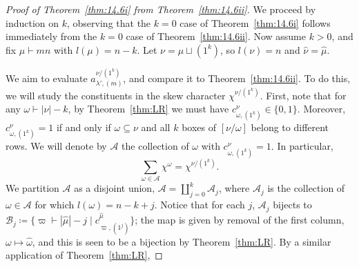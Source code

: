 \begin{proof}[Proof of Theorem~\ref{thm:14.6i} from Theorem~\ref{thm:14.6ii}]
	We proceed by induction on $k$, observing that the $k=0$ case of Theorem~\ref{thm:14.6i} follows immediately from the $k=0$ case of Theorem~\ref{thm:14.6ii}. 
	Now assume $k>0$, and fix $\mu\vdash mn$ with $l(\mu)=n-k$. Let $\nu=\mu\sqcup(1^k)$, so $l(\nu)=n$ and $\hat{\nu}=\hat{\mu}$.
	
	We aim to evaluate $a^{\nu/(1^k)}_{\lambda',(m)}$, and compare it to Theorem~\ref{thm:14.6ii}. To do this, we will study the constituents in the skew character $\chi^{\nu/(1^k)}$. First, note that for any $\omega\vdash|\nu|-k$, by Theorem~\ref{thm:LR} we must have $c^\nu_{\omega,(1^k)}\in\{0,1\}$. Moreover, $c^\nu_{\omega,(1^k)}=1$ if and only if $\omega\subseteq\nu$ and all $k$ boxes of $[\nu/\omega]$ belong to different rows. We will denote by $\mathcal{A}$ the collection of $\omega$ with $c^\nu_{\omega,(1^k)}=1$. In particular,
	\[ \sum_{\omega\in\mathcal{A}}\chi^\omega = \chi^{{\nu}/(1^k)}. \]
	We partition $\mathcal{A}$ as a disjoint union, $\mathcal{A} = \coprod_{j=0}^{k}\mathcal{A}_j$, where $\mathcal{A}_j$ is the collection of $\omega\in\mathcal{A}$ for which $l(\omega)=n-k+j$. Notice that for each $j$, $\mathcal{A}_j$ bijects to $\mathcal{B}_j \coloneqq  \{\varpi\vdash|\hat{\mu}|-j \mid c^{\hat{\mu}}_{\varpi,(1^j)}\}$; the map is given by removal of the first column, $\omega\mapsto\hat{\omega}$, and this is seen to be a bijection by Theorem~\ref{thm:LR}. By a similar application of Theorem~\ref{thm:LR},
	

\end{proof}
